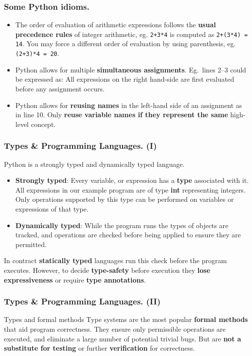 \documentclass{beamer} %
\newcommand\emc[1]{\textcolor{brightblue}{\textbf{#1}}}
\begin{document}
\begin{frame}
\frametitle{Some Python idioms.}

\begin{itemize}
	\item The order of evaluation of arithmetic expressions follows the \emc{usual precedence rules} of integer arithmetic, eg. \texttt{2+3*4} is computed as \texttt{2+(3*4) = 14}. You may force a different order of evaluation by using parenthesis, eg. \texttt{(2+3)*4 = 20}.
	\item Python allows for multiple \emc{simultaneous assignments}. Eg.\ lines 2--3 could be expressed as:
	All expressions on the right hand-side are first evaluated before any assignment occurs.
	\item Python allows for \emc{reusing names} in the left-hand side of an assignment as in line 10.
	Only \emc{reuse variable names if they represent the same} high-level concept.

\end{itemize}

\end{frame}

\begin{frame}
\frametitle{Types \& Programming Languages. (I)}

Python is a strongly typed and dynamically typed language. 
\begin{itemize}
\item \emc{Strongly typed}: Every variable, or expression has a \emc{type} associated with it. All expressions in our example program are of type \emc{int} representing integers. Only operations supported by this type can be performed on variables or expressions of that type.
\item \emc{Dynamically typed}: While the program runs the types of objects are tracked, and operations are checked before being applied to ensure they are permitted. 
\end{itemize}

\vspace{5mm}
In contract \emc{statically typed} languages run this check before the program executes. However, to decide \emc{type-safety} before execution they \emc{lose expressiveness} or require \emc{type annotations}.

\end{frame}

\begin{frame}
\frametitle{Types \& Programming Languages. (II)}

\begin{block}{Types and formal methods}
Type systems are the most popular \emc{formal methods} that aid program correctness. They ensure only permissible operations are executed, and eliminate a large number of potential trivial bugs. But are \emc{not a substitute for testing} or further \emc{verification} for correctness.
\end{block}

\end{frame}
\end{document}
